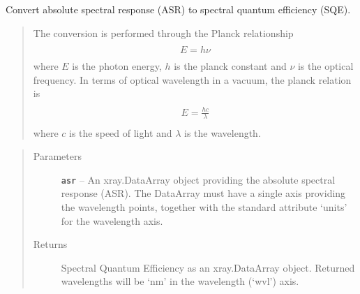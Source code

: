 \documentclass[a4paper,10pt,english]{sphinxmanual}
\begin{document}
\begin{fulllineitems}
\label{packages:electro.xd_asr2sqe}
Convert absolute spectral response (ASR) to spectral quantum efficiency (SQE).
\begin{quote}

The conversion is performed through the Planck relationship
\begin{align*}\begin{aligned}
\begin{split}E=h\nu\end{split}\end{aligned}\end{align*}
where \(E\) is the photon energy, \(h\) is the planck constant and \(\nu\) is the optical
frequency.
In terms of optical wavelength in a vacuum, the planck relation is
\begin{align*}\begin{aligned}
\begin{split}E=\frac{hc}{\lambda}\end{split}\end{aligned}\end{align*}
where \(c\) is the speed of light and \(\lambda\) is the wavelength.
\end{quote}
\begin{quote}\begin{description}
\item[{Parameters}] \leavevmode
\textbf{\texttt{asr}} -- An xray.DataArray object providing the absolute spectral response (ASR). The DataArray must have a single
axis providing the wavelength points, together with the standard attribute `units' for the wavelength axis.

\item[{Returns}] \leavevmode
Spectral Quantum Efficiency as an xray.DataArray object. Returned wavelengths will be `nm' in
the wavelength (`wvl') axis.

\end{description}\end{quote}

\end{fulllineitems}

\end{document}
